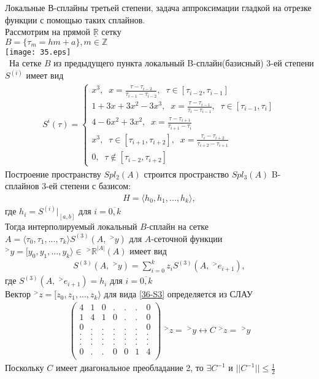 \documentclass[__main__.tex]{subfiles}
\begin{document}
Локальные В-сплайны третьей степени, задача аппроксимации гладкой на отрезке функции с помощью таких сплайнов.\\

Рассмотрим на прямой $\underline{\mathbb{R}}$ сетку\\ $B = \{\tau_m = hm + a\}, m \in \mathbb{Z}$\\
\texttt{[image: 35.eps]}\\
\
На сетке $B$ из предыдущего пункта локальный B-сплайн(базисный) 3-ей степени $S^{(i)}$ имеет вид
\begin{gather*}
	S^i(\tau) = 
	\begin{cases}
		x^3, \;\; x = \frac{\tau - \tau_{i-2}}{\tau_{i-1} - \tau_{i-2}}, \;\; \tau \in [\tau_{i-2}, \tau_{i-1}]\\
		1 + 3x + 3x^2 - 3x^3, \;\; x = \frac{\tau - \tau_{i-1}}{\tau_i - \tau_{i-1}}, \;\; \tau \in [\tau_{i-1}, \tau_i]\\
		4 - 6x^2 + 3x^2, \;\; x = \frac{\tau - \tau_{i+1}}{\tau_{i+1} - \tau_{i}}\\
		x^3, \;\; \tau \in [\tau_{i+1}, \tau_{i+2}], \;\; x = \frac{\tau_i - \tau_{i+2}}{\tau_{i+2} - \tau_{i+1}}\\
		0, \;\; \tau \notin [\tau_{i-2}, \tau_{i+2}]
	\end{cases}
\end{gather*}
Построение пространству $Spl_2(A)$ строится пространство $Spl_3(A)$ B-сплайнов 3-ей степени с базисом:
\begin{gather*}
	H = \langle h_0, h_1, ..., h_k \rangle,
\end{gather*}
где $h_i = S^{(i)}|_{[a, b]}$ для $i = \overline{0,k}$\\
Тогда интерполируемый локальный $B$-сплайн на сетке $A = \langle \tau_0, \tau_1, ..., \tau_k \rangle S^{(3)}(A, \;^>y)$ для $A$-сеточной функции $^>y = [ y_0, y_1, ..., y_k \rangle \in\; ^> \mathbb{R}^{|A|}(A)$ имеет вид 
\begin{gather}
S^{(3)}(A, \;^>y) = \sum_{i=0}^{k}{z_iS^{(3)}(A, \;^>e_{i+1})},
\label{36-S3}	
\end{gather}
где $S^{(3)}(A, \;^>e_{i+1}) = h_i$ для $i = \overline{0,k}$\\
Вектор $^>z = [ z_0, z_1, ..., z_k \rangle$ для вида \ref{36-S3} определяется из СЛАУ
\begin{gather*}
	\begin{pmatrix}
		4 & 1 & 0 & . & . & . & 0\\
		1 & 4 & 1 & 0 & . & . & 0\\
		0 & . & . & . & . & . & 0\\
		. & . & . & . & . & . & .\\
		. & . & . & . & . & . & .\\
		. & . & . & . & . & . & .\\
		0 & . & . & 0 & 0 & 1 & 4\\				
	\end{pmatrix}
	\;^>z = \;^>y \leftrightarrow C\;^>z = \;^>y
\end{gather*}
Поскольку $C$ имеет диагональное преобладание 2, то $\exists C^{-1}$ и $||C^{-1}||\leq \frac{1}{2}$
\end{document}
